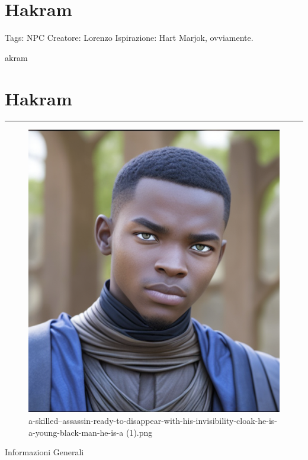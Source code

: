 \section{Hakram}\label{hakram}

Tags: NPC Creatore: Lorenzo Ispirazione: Hart Marjok, ovviamente.

akram

\section{Hakram}\label{hakram-1}

\begin{center}\rule{0.5\linewidth}{0.5pt}\end{center}

\begin{figure}
\centering
\includegraphics{a-skilled--assassin-ready-to-disappear-with-his-invisibility-cloak-he-is-a-young-black-man-he-is-a_(1).png}
\caption{a-skilled--assassin-ready-to-disappear-with-his-invisibility-cloak-he-is-a-young-black-man-he-is-a
(1).png}
\end{figure}

Informazioni Generali

